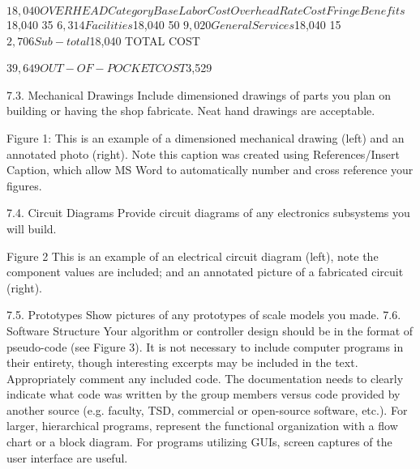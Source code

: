 $18,040
OVERHEAD
Category


Base Labor Cost
Overhead Rate
Cost

Fringe Benefits


$18,040
35%
$6,314

Facilities


$18,040
50%
$9,020

General Services


$18,040
15%
$2,706
Sub-total





$18,040
TOTAL COST





$39,649
OUT-OF-POCKET COST





$3,529

        7.3. Mechanical Drawings
Include dimensioned drawings of parts you plan on building or having the shop fabricate.   Neat hand drawings are acceptable. 



Figure 1: This is an example of a dimensioned mechanical drawing (left) and an annotated photo (right).   Note this caption was created using References/Insert Caption, which allow MS Word to automatically number and cross reference your figures.

        7.4. Circuit Diagrams
Provide circuit diagrams of any electronics subsystems you will build.

Figure 2  This is an example of an electrical circuit diagram (left), note the component values are included; and an annotated picture of a fabricated circuit (right).  

        7.5. Prototypes
Show pictures of any prototypes of scale models you made.
        7.6. Software Structure 
Your algorithm or controller design should be in the format of pseudo-code (see Figure 3). It is not necessary to include computer programs in their entirety, though interesting excerpts may be included in the text. Appropriately comment any included code. The documentation needs to clearly indicate what code was written by the group members versus code provided by another source (e.g. faculty, TSD, commercial or open-source software, etc.).  For larger, hierarchical programs, represent the functional organization with a flow chart or a block diagram.  For programs utilizing GUIs, screen captures of the user interface are useful.   

